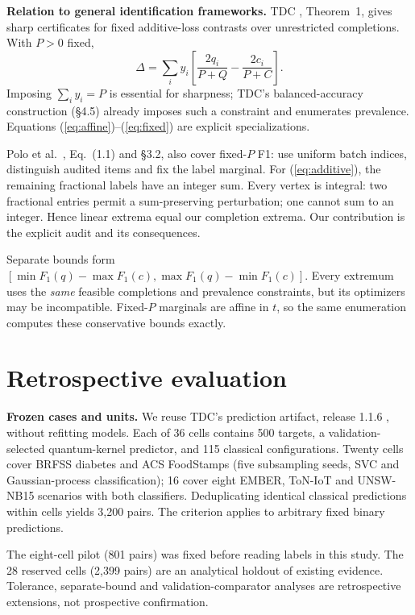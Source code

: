 \documentclass[a4paper]{esannV2}
\newcommand{\F}{F_1}
\begin{document}
\medskip\noindent\textbf{Relation to general identification frameworks.}
TDC \cite{tdc}, Theorem~1, gives sharp certificates for fixed additive-loss
contrasts over unrestricted completions. With $P>0$ fixed,
\begin{equation}\label{eq:additive}
 \Delta=\sum_i y_i\left[\frac{2q_i}{P+Q}-\frac{2c_i}{P+C}\right].
\end{equation}
Imposing $\sum_i y_i=P$ is essential for sharpness; TDC's balanced-accuracy
construction (\S4.5) already imposes such a constraint and enumerates prevalence.
Equations (\ref{eq:affine})--(\ref{eq:fixed}) are explicit specializations.

Polo et al.\ \cite{polo2024}, Eq.~(1.1) and \S3.2, also cover fixed-$P$ F1:
use uniform batch indices, distinguish audited items and fix the label marginal.
For (\ref{eq:additive}), the remaining fractional labels have an integer sum.
Every vertex is integral: two fractional entries permit a sum-preserving
perturbation; one cannot sum to an integer. Hence linear extrema equal our
completion extrema. Our contribution is the explicit audit and its consequences.

Separate bounds form
$[\min\F(q)-\max\F(c),\allowbreak\max\F(q)-\min\F(c)]$. Every extremum uses the
\emph{same} feasible completions and prevalence constraints, but its optimizers
may be incompatible. Fixed-$P$ marginals are affine in $t$, so the same
enumeration computes these conservative bounds exactly.

\section{Retrospective evaluation}
\noindent\textbf{Frozen cases and units.} We reuse TDC's prediction artifact,
release 1.1.6 \cite{tdcartifact}, without refitting models. Each of 36 cells
contains 500 targets, a validation-selected quantum-kernel predictor, and
115 classical configurations. Twenty cells cover BRFSS diabetes and ACS
FoodStamps (five subsampling seeds, SVC and Gaussian-process classification);
16 cover eight EMBER, ToN-IoT and UNSW-NB15 scenarios with both classifiers.
Deduplicating identical classical predictions within cells yields 3,200 pairs.
The criterion applies to arbitrary fixed binary predictions.

The eight-cell pilot (801 pairs) was fixed before reading labels in this study.
The 28 reserved cells (2,399 pairs) are an analytical holdout of existing
evidence. Tolerance, separate-bound and validation-comparator analyses are
retrospective extensions, not prospective confirmation.
\end{document}
